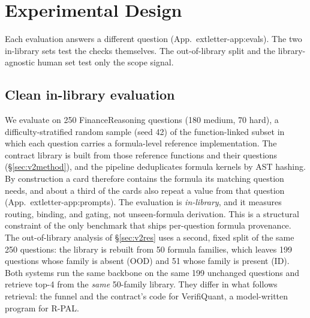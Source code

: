 \documentclass[sigconf]{acmart}
\newif\ifarxiv
\newcommand{\extref}[1]{App.~\ifarxiv\ref{#1}\else\csname extletter-#1\endcsname\fi}
\begin{document}
\section{Experimental Design}\label{sec:v2design}
Each evaluation answers a different question (\extref{app:evals}). The two in-library sets test the checks themselves. The out-of-library split and the library-agnostic human set test only the scope signal.

\subsection{Clean in-library evaluation}
We evaluate on 250 FinanceReasoning \cite{tang2025financereasoning} questions (180 medium, 70 hard), a difficulty-stratified random sample (seed 42) of the function-linked subset in which each question carries a formula-level reference implementation.
The contract library is built from those reference functions and their questions (\S\ref{sec:v2method}), and the pipeline deduplicates formula kernels by AST hashing.
By construction a card therefore contains the formula its matching question needs, and about a third of the cards also repeat a value from that question (\extref{app:prompts}). The evaluation is \emph{in-library}, and it measures routing, binding, and gating, not unseen-formula derivation.
This is a structural constraint of the only benchmark that ships per-question formula provenance.
The out-of-library analysis of \S\ref{sec:v2res} uses a second, fixed split of the same 250 questions: the library is rebuilt from 50 formula families, which leaves 199 questions whose family is absent (OOD) and 51 whose family is present (ID). Both systems run the same backbone on the same 199 unchanged questions and retrieve top-4 from the \emph{same} 50-family library. They differ in what follows retrieval: the funnel and the contract's code for VerifiQuant, a model-written program for R-PAL.
\end{document}
